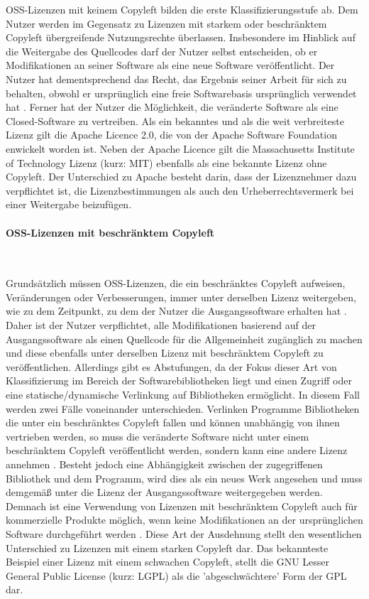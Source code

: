 OSS-Lizenzen mit keinem Copyleft bilden die erste Klassifizierungsstufe ab. Dem Nutzer werden im Gegensatz zu Lizenzen mit starkem oder beschränktem Copyleft übergreifende Nutzungsrechte überlassen. Insbesondere im Hinblick auf die Weitergabe des Quellcodes darf der Nutzer selbst entscheiden, ob er  Modifikationen an seiner Software als eine neue Software veröffentlicht. Der Nutzer hat dementsprechend das Recht, das Ergebnis seiner Arbeit für sich zu behalten, obwohl er ursprünglich eine freie Softwarebasis ursprünglich verwendet hat \cite[S. 17]{bitkom_open_2016}. Ferner hat der Nutzer die Möglichkeit, die veränderte Software als eine Closed-Software zu vertreiben. Als ein bekanntes und als die weit verbreiteste Lizenz gilt die Apache Licence 2.0, die von der Apache Software Foundation \cite{the_apache_software_foundation_apache_2004} enwickelt worden ist. Neben der Apache Licence gilt die Massachusetts Institute of Technology Lizenz (kurz: MIT) \cite{open_source_inititative_open_nodate} ebenfalls als eine bekannte Lizenz ohne Copyleft. Der Unterschied zu Apache besteht darin, dass der Lizenznehmer dazu verpflichtet ist, die Lizenzbestimmungen als auch den Urheberrechtsvermerk bei einer Weitergabe beizufügen. 

\paragraph{OSS-Lizenzen mit beschränktem Copyleft}$~$

Grundsätzlich müssen OSS-Lizenzen, die ein beschränktes Copyleft aufweisen, Veränderungen oder Verbesserungen, immer unter derselben Lizenz weitergeben, wie zu dem Zeitpunkt, zu dem der Nutzer die Ausgangssoftware erhalten hat \cite[S. 18]{bitkom_open_2016}. Daher ist der Nutzer verpflichtet, alle Modifikationen basierend auf der Ausgangssoftware als einen Quellcode für die Allgemeinheit zugänglich zu machen und diese ebenfalls unter derselben Lizenz mit beschränktem Copyleft zu veröffentlichen. Allerdings gibt es Abstufungen, da der Fokus dieser Art von Klassifizierung im Bereich der Softwarebibliotheken liegt und einen Zugriff oder eine statische/dynamische Verlinkung auf Bibliotheken ermöglicht. In diesem Fall werden zwei Fälle voneinander unterschieden. Verlinken Programme Bibliotheken die unter ein beschränktes Copyleft fallen und können unabhängig von ihnen vertrieben werden, so muss die veränderte Software nicht unter einem beschränktem Copyleft veröffentlicht werden, sondern kann eine andere Lizenz annehmen \cite[S. 35 - 38]{schaaf_open-source-lizenzen_2013}. Besteht jedoch eine Abhängigkeit zwischen der zugegriffenen Bibliothek und dem Programm, wird dies als ein neues Werk angesehen und muss demgemäß unter die Lizenz der Ausgangssoftware weitergegeben werden. Demnach ist eine Verwendung von Lizenzen mit beschränktem Copyleft auch für kommerzielle Produkte möglich, wenn keine Modifikationen an der ursprünglichen Software durchgeführt werden \cite[S. 21]{renner_open_2006}. Diese Art der Ausdehnung stellt den wesentlichen Unterschied zu Lizenzen mit einem starken Copyleft dar. Das bekannteste Beispiel einer Lizenz mit einem schwachen Copyleft, stellt die GNU Lesser General Public License (kurz: LGPL) als die 'abgeschwächtere' Form der GPL dar. 

